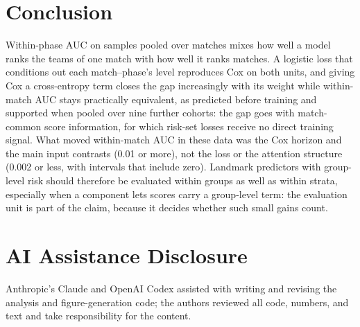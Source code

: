 \documentclass[sigconf,anonymous]{acmart}
\begin{document}
\section{Conclusion}
\label{sec:conclusion}
Within-phase AUC on samples pooled over matches mixes how well a model ranks the teams of one match with how well it ranks matches. A logistic loss that conditions out each match--phase's level reproduces Cox on both units, and giving Cox a cross-entropy term closes the gap increasingly with its weight while within-match AUC stays practically equivalent, as predicted before training and supported when pooled over nine further cohorts: the gap goes with match-common score information, for which risk-set losses receive no direct training signal. What moved within-match AUC in these data was the Cox horizon and the main input contrasts (0.01 or more), not the loss or the attention structure (0.002 or less, with intervals that include zero). Landmark predictors with group-level risk should therefore be evaluated within groups as well as within strata, especially when a component lets scores carry a group-level term: the evaluation unit is part of the claim, because it decides whether such small gains count.

\section*{AI Assistance Disclosure}
Anthropic's Claude and OpenAI Codex assisted with writing and revising the analysis and figure-generation code; the authors reviewed all code, numbers, and text and take responsibility for the content.



\end{document}
